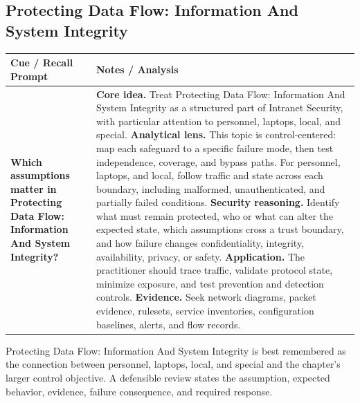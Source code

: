 \documentclass[11pt]{article}
\newcommand{\CornellHeader}{%
\rowcolor{Navy}\color{white}\bfseries Cue / Recall Prompt & \color{white}\bfseries Notes / Analysis\\\hline}
\newcommand{\CornellRow}[2]{%
\cellcolor{CueGray}\RaggedRight\textbf{#1} & \RaggedRight #2\\\hline}
\begin{document}
\subsection*{Protecting Data Flow: Information And System Integrity}
\begin{longtable}{>{\RaggedRight\arraybackslash}p{}|>{\RaggedRight\arraybackslash}p{}}
\CornellHeader
\CornellRow{Which assumptions matter in Protecting Data Flow: Information And System Integrity?}{\textbf{Core idea.} Treat Protecting Data Flow: Information And System Integrity as a structured part of Intranet Security, with particular attention to personnel, laptops, local, and special. \textbf{Analytical lens.} This topic is control-centered: map each safeguard to a specific failure mode, then test independence, coverage, and bypass paths. For personnel, laptops, and local, follow traffic and state across each boundary, including malformed, unauthenticated, and partially failed conditions. \textbf{Security reasoning.} Identify what must remain protected, who or what can alter the expected state, which assumptions cross a trust boundary, and how failure changes confidentiality, integrity, availability, privacy, or safety. \textbf{Application.} The practitioner should trace traffic, validate protocol state, minimize exposure, and test prevention and detection controls. \textbf{Evidence.} Seek network diagrams, packet evidence, rulesets, service inventories, configuration baselines, alerts, and flow records.}
\end{longtable}
\begin{topicsummary}
Protecting Data Flow: Information And System Integrity is best remembered as the connection between personnel, laptops, local, and special and the chapter's larger control objective. A defensible review states the assumption, expected behavior, evidence, failure consequence, and required response.
\end{topicsummary}
\end{document}
